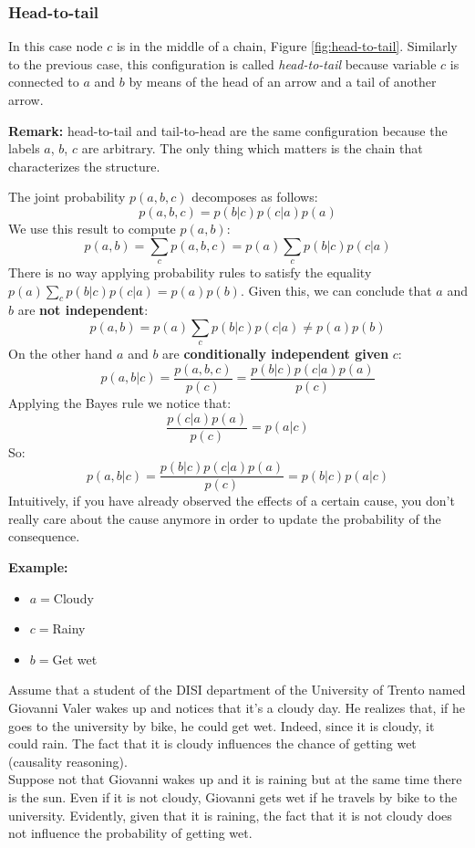 \subsubsection{Head-to-tail}
In this case node $c$ is in the middle of a chain, Figure \ref{fig:head-to-tail}. Similarly to the previous case, this configuration is called \textit{head-to-tail} because variable $c$ is connected to $a$ and $b$ by means of the head of an arrow and a tail of another arrow. \newline

\textbf{Remark:} head-to-tail and tail-to-head are the same configuration because the labels $a$, $b$, $c$ are arbitrary. The only thing which matters is the chain that characterizes the structure. \newline

The joint probability $p(a,b,c)$ decomposes as follows:
$$p(a,b,c) = p(b|c)p(c|a)p(a)$$
We use this result to compute $p(a,b)$:
$$p(a,b) = \sum_c p(a,b,c) = p(a) \sum_c p(b|c)p(c|a)$$
There is no way applying probability rules to satisfy the equality $p(a) \sum_c p(b|c)p(c|a) = p(a)p(b)$. Given this, we can conclude that $a$ and $b$ are \textbf{not independent}:
$$p(a,b) = p(a)\sum_c p(b|c)p(c|a) \neq p(a)p(b)$$
On the other hand $a$ and $b$ are \textbf{conditionally independent given} $c$:
$$p(a,b | c) = \frac{p(a,b,c)}{p(c)} = \frac{p(b|c)p(c|a)p(a)}{p(c)}$$
Applying the Bayes rule we notice that:
$$\frac{p(c|a)p(a)}{p(c)} = p(a|c)$$
So:
$$p(a,b | c) = \frac{p(b|c)p(c|a)p(a)}{p(c)} = p(b|c)p(a|c)$$
Intuitively, if you have already observed the effects of a certain cause, you don't really care about the cause anymore in order to update the probability of the consequence. \newline

\textbf{Example:}
\begin{itemize}
    \item $a=$Cloudy
    \item $c=$Rainy
    \item $b=$Get wet
\end{itemize}
Assume that a student of the DISI department of the University of Trento named Giovanni Valer wakes up and notices that it's a cloudy day. He realizes that, if he goes to the university by bike, he could get wet. Indeed, since it is cloudy, it could rain. The fact that it is cloudy influences the chance of getting wet (causality reasoning).\\
Suppose not that Giovanni wakes up and it is raining but at the same time there is the sun. Even if it is not cloudy, Giovanni gets wet if he travels by bike to the university. Evidently, given that it is raining, the fact that it is not cloudy does not influence the probability of getting wet.

